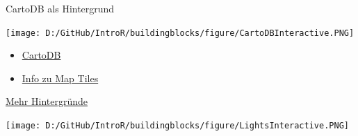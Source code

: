 \documentclass[ignorenonframetext,]{beamer}
\newenvironment{Shaded}{\begin{snugshade}}{\end{snugshade}}
\newcommand{\KeywordTok}[1]{\textcolor[rgb]{0.26,0.66,0.93}{\textbf{#1}}}
\newcommand{\NormalTok}[1]{\textcolor[rgb]{0.74,0.68,0.62}{#1}}
\newcommand{\OperatorTok}[1]{\textcolor[rgb]{0.74,0.68,0.62}{#1}}
\newcommand{\StringTok}[1]{\textcolor[rgb]{0.02,0.61,0.04}{#1}}
\begin{document}
\begin{frame}[fragile]{CartoDB als Hintergrund}
\protect\hypertarget{cartodb-als-hintergrund}{}

\begin{Shaded}
\end{Shaded}

\texttt{[image: D:/GitHub/IntroR/buildingblocks/figure/CartoDBInteractive.PNG]}

\begin{itemize}
\item
  \href{https://carto.com/attribution}{CartoDB}
\item
  \href{https://www.mapbox.com/help/how-web-maps-work/}{Info zu Map
  Tiles}
\end{itemize}

\end{frame}

\begin{frame}[fragile]{\href{http://leaflet-extras.github.io/leaflet-providers/preview/index.html}{Mehr
Hintergründe}}
\protect\hypertarget{mehr-hintergrunde}{}

\begin{Shaded}
\end{Shaded}

\texttt{[image: D:/GitHub/IntroR/buildingblocks/figure/LightsInteractive.PNG]}

\end{frame}
\end{document}
